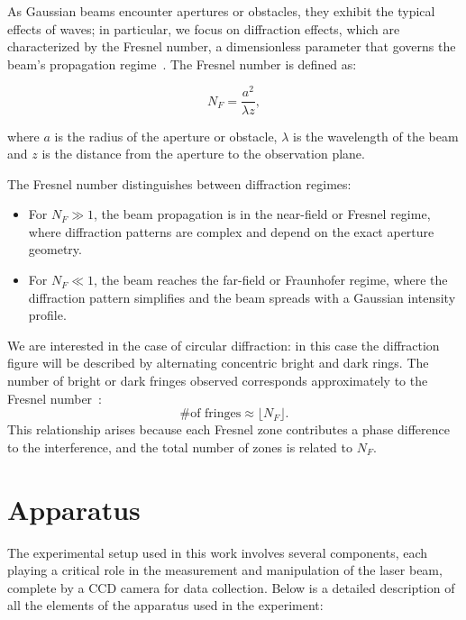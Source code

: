 \documentclass[prl,twocolumn]{revtex4-1}
\begin{document}
As Gaussian beams encounter apertures or obstacles, they exhibit the typical effects of waves; in particular, we focus on diffraction effects, which are characterized by the Fresnel number, a dimensionless parameter that governs the beam's propagation regime~\cite{pap2}. The Fresnel number is defined as:

\begin{equation}
\label{eq:fresnel_number}
N_F = \frac{a^2}{\lambda z},
\end{equation}

where $a$ is the radius of the aperture or obstacle, $\lambda$ is the wavelength of the beam and $z$ is the distance from the aperture to the observation plane.

The Fresnel number distinguishes between diffraction regimes:
\begin{itemize}
    \item For $N_F \gg 1$, the beam propagation is in the near-field or Fresnel regime, where diffraction patterns are complex and depend on the exact aperture geometry.
    \item For $N_F \ll 1$, the beam reaches the far-field or Fraunhofer regime, where the diffraction pattern simplifies and the beam spreads with a Gaussian intensity profile.
\end{itemize}

We are interested in the case of circular diffraction: in this case the diffraction figure will be described by alternating concentric bright and dark rings. The number of bright or dark fringes observed corresponds approximately to the Fresnel number~\cite{pap2}:
\begin{equation}
\text{\# of fringes} \approx \lfloor N_F \rfloor.
\end{equation}
This relationship arises because each Fresnel zone contributes a phase difference to the interference, and the total number of zones is related to $N_F$.

\section{Apparatus}

The experimental setup used in this work involves several components, each playing a critical role in the measurement and manipulation of the laser beam, complete by a CCD camera for data collection. Below is a detailed description of all the elements of the apparatus used in the experiment:
\end{document}
